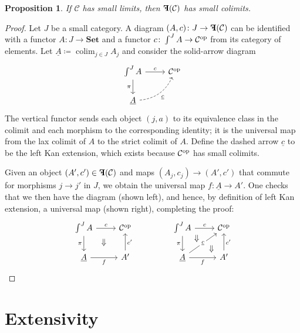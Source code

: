 \documentclass[11pt, one side, article]{memoir}
\theoremstyle{definition}
\theoremstyle{plain}
\newtheorem{proposition}[definitionx]{Proposition}
\DeclareMathOperator*{\colim}{colim}
\newcommand{\cat}[1]{\mathcal{#1}}%
\newcommand{\Cat}[1]{\mathbf{#1}}%
\newcommand{\op}{^\tn{op}}
\newcommand{\tn}[1]{\textnormal{#1}}
\newcommand{\ul}[1]{\underline{#1}}
\newcommand{\smset}{\Cat{Set}}
\newcommand{\0}{\Cat{0}}
\newcommand{\1}{\Cat{1}}
\newcommand{\mn}{\reflectbox{$\Cat{F}$}}
\begin{document}
\begin{proposition}\label{prop.limits_to_colimits}
If $\cat{C}$ has small limits, then $\mn(\cat{C})$ has small colimits.
\end{proposition}
\begin{proof}
Let $J$ be a small category. A diagram $(A,c)\colon J\to \mn(\cat{C})$ can be identified with a functor $A\colon J\to \smset$ and a functor $c\colon \int^JA\to\cat{C}\op$ from its category of elements. Let $\ul{A}\coloneqq\colim_{j\in J}A_j$ and consider the solid-arrow diagram
\[
\begin{tikzcd}
	\int^JA\ar[r, "c"]\ar[d, "\pi"']&
	\cat{C}\op\\
	\ul{A}\ar[ur, bend right, dashed, "\ul{c}"']
\end{tikzcd}
\]
The vertical functor sends each object $(j,a)$ to its equivalence class in the colimit and each morphism to the corresponding identity; it is the universal map from the lax colimit of $A$ to the strict colimit of $A$. Define the dashed arrow $\ul{c}$ to be the left Kan extension, which exists because $\cat{C}\op$ has small colimits.

Given an object $(A',c')\in\mn(\cat{C})$ and maps $(A_j,c_j)\to(A',c')$ that commute for morphisms $j\to j'$ in $J$, we obtain the universal map $f\colon\ul{A}\to A'$. One checks that we then have the diagram (shown left), and hence, by definition of left Kan extension, a universal map (shown right), completing the proof:
\[
\begin{tikzcd}
	\int^JA\ar[r, "c"]\ar[d, "\pi"']&
	\cat{C}\op\\
	\ul{A}\ar[r, "f"']&A'\ar[u, "c'"']\ar[ul, phantom, pos=.6, "\Downarrow"]
\end{tikzcd}
\hspace{.6in}
\begin{tikzcd}
	\int^JA\ar[r, "c"]\ar[d, "\pi"']&
	\cat{C}\op\\
	\ul{A}\ar[r, "f"']\ar[ur, "\ul{c}" description]&A'\ar[u, "c'"']
	\ar[ul, phantom, pos=.2, "\Downarrow"]\ar[ul, phantom, pos=.85, "\Downarrow"]
\end{tikzcd}
\qedhere
\]
\end{proof}

\section{Extensivity}
\end{document}
